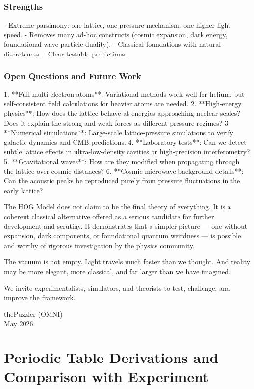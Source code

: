 \documentclass[11pt,a4paper]{book}
\begin{document}
{\subsection{Strengths}
- Extreme parsimony: one lattice, one pressure mechanism, one higher light speed.
- Removes many ad-hoc constructs (cosmic expansion, dark energy, foundational wave-particle duality).
- Classical foundations with natural discreteness.
- Clear testable predictions.

\subsection{Open Questions and Future Work}
1. **Full multi-electron atoms**: Variational methods work well for helium, but self-consistent field calculations for heavier atoms are needed.
2. **High-energy physics**: How does the lattice behave at energies approaching nuclear scales? Does it explain the strong and weak forces as different pressure regimes?
3. **Numerical simulations**: Large-scale lattice-pressure simulations to verify galactic dynamics and CMB predictions.
4. **Laboratory tests**: Can we detect subtle lattice effects in ultra-low-density cavities or high-precision interferometry?
5. **Gravitational waves**: How are they modified when propagating through the lattice over cosmic distances?
6. **Cosmic microwave background details**: Can the acoustic peaks be reproduced purely from pressure fluctuations in the early lattice?

The HOG Model does not claim to be the final theory of everything. It is a coherent classical alternative offered as a serious candidate for further development and scrutiny. It demonstrates that a simpler picture — one without expansion, dark components, or foundational quantum weirdness — is possible and worthy of rigorous investigation by the physics community.

The vacuum is not empty.  
Light travels much faster than we thought.  
And reality may be more elegant, more classical, and far larger than we have imagined.

We invite experimentalists, simulators, and theorists to test, challenge, and improve the framework.

\begin{flushright}
thePuzzler (OMNI) \\
May 2026
\end{flushright}

\appendix
\chapter{Periodic Table Derivations and Comparison with Experiment}

}
\end{document}
